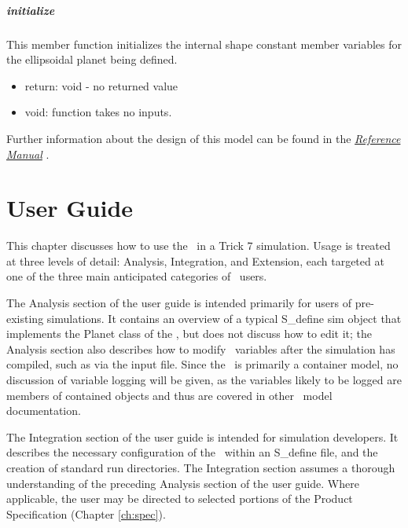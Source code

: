 \paragraph{initialize}

This member function initializes the internal shape constant member variables
for the ellipsoidal planet being defined.

\begin{itemize}
\item{return:} void - no returned value
\item{void:} function takes no inputs.
\end{itemize}

Further information about the design of this model can be found
in the  \href{file:refman.pdf} {\em Reference Manual}
\cite{planetbib:ReferenceManual}.







\chapter{User Guide}\label{ch:user}
This chapter discusses how to use the \planetDesc\ in a Trick 7
simulation. Usage is treated at three levels of detail: Analysis,
Integration, and Extension, each targeted at one of the three main anticipated
categories of \JEODid\ users.

The Analysis section of the user guide is intended primarily for users of
pre-existing simulations. It contains an overview of a typical S\_define sim
object that implements the Planet class of the \planetDesc, but does not
discuss how to edit it; the Analysis section also describes how to modify
\planetDesc\ variables after the simulation has compiled, such as via the input
file. Since the \planetDesc\ is primarily a container model, no discussion of
variable logging will be given, as the variables likely to be logged are
members of contained objects and thus are covered in other \JEODid\
model documentation.

The Integration section of the user guide is intended for simulation developers.
It describes the necessary configuration of the \planetDesc\ within an
S\_define file, and the creation of standard run directories.  The Integration
section assumes a thorough understanding of the preceding Analysis section
of the user guide. Where applicable, the user may be directed to selected
portions of the Product Specification (Chapter \ref{ch:spec}).

